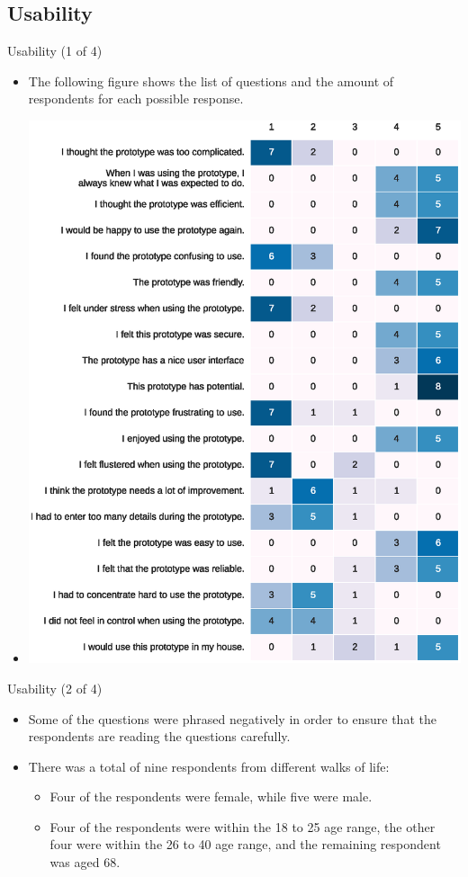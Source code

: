 \subsection{Usability}
\begin{frame}{Usability (1 of 4)}
\begin{itemize}
    \item<1-> The following figure shows the list of questions and the amount of respondents for each possible response.
    \item<2-> \includegraphics[scale=0.25]{uat-results.eps}
\end{itemize}
\end{frame}
\begin{frame}{Usability (2 of 4)}
\begin{itemize}
    \item<1-> Some of the questions were phrased negatively in order to ensure that the respondents are reading the questions carefully.
    \item<2-> There was a total of nine respondents from different walks of life:
    \begin{itemize}
        \item<3-> Four of the respondents were female, while five were male.
        \item<4-> Four of the respondents were within the 18 to 25 age range, the other four were within the 26 to 40 age range, and the remaining respondent was aged 68.
    \end{itemize}
\end{itemize}
\end{frame}

